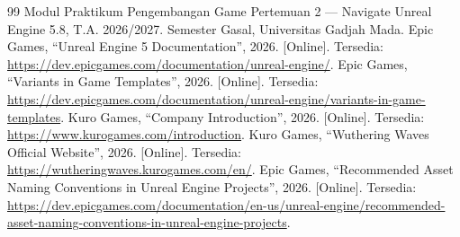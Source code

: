 \documentclass[a4paper,oneside,12pt]{report}
\renewcommand{\bibname}{Daftar Pustaka}
\begin{document}
\clearpage
{}
\renewcommand{\bibname}{Daftar Pustaka}
\begin{thebibliography}{99}
     Modul Praktikum Pengembangan Game Pertemuan 2 --- Navigate Unreal Engine 5.8, T.A. 2026/2027. Semester Gasal, Universitas Gadjah Mada.
     Epic Games, ``Unreal Engine 5 Documentation'', 2026. [Online]. Tersedia: \url{https://dev.epicgames.com/documentation/unreal-engine/}.
     Epic Games, ``Variants in Game Templates'', 2026. [Online]. Tersedia: \url{https://dev.epicgames.com/documentation/unreal-engine/variants-in-game-templates}.
     Kuro Games, ``Company Introduction'', 2026. [Online]. Tersedia: \url{https://www.kurogames.com/introduction}.
     Kuro Games, ``Wuthering Waves Official Website'', 2026. [Online]. Tersedia: \url{https://wutheringwaves.kurogames.com/en/}.
     Epic Games, ``Recommended Asset Naming Conventions in Unreal Engine Projects'', 2026. [Online]. Tersedia: \url{https://dev.epicgames.com/documentation/en-us/unreal-engine/recommended-asset-naming-conventions-in-unreal-engine-projects}.
\end{thebibliography}
\end{document}
